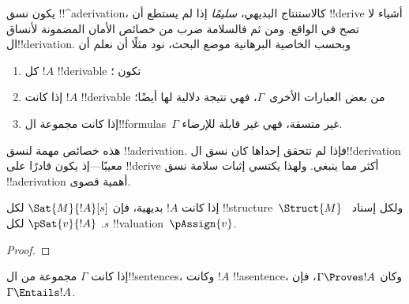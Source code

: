 \documentclass[../../../include/open-logic-section]{subfiles}
\begin{document}
      {}
      {}


\begin{explain}
يكون نسق !!^a{derivation}، كالاستنتاج البديهي، \emph{سليمًا} إذا لم
يستطع أن !!{derive} أشياء لا تصح في الواقع. ومن ثم فالسلامة ضرب من
خصائص الأمان المضمونة لأنساق ال!!{derivation}. وبحسب الخاصية البرهانية
موضع البحث، نود مثلًا أن نعلم أن
\begin{enumerate}
\item كل $!A$ !!{derivable} تكون ؛
\item إذا كانت $!A$ !!{derivable} من بعض العبارات الأخرى~$\Gamma$،
  فهي نتيجة دلالية لها أيضًا؛
\item إذا كانت مجموعة ال!!{formula}s~$\Gamma$ غير متسقة، فهي غير قابلة
  للإرضاء.
\end{enumerate}
هذه خصائص مهمة لنسق !!a{derivation}. فإذا لم تتحقق إحداها كان نسق
ال!!{derivation} معيبًا---إذ يكون قادرًا على !!{derive} أكثر مما ينبغي.
ولهذا يكتسي إثبات سلامة نسق !!a{derivation} أهمية قصوى.
\end{explain}

\begin{prop}
  إذا كانت $!A$ بديهية، فإن
    {$\Sat{M}{!A}[s]$ لكل !!{structure}~$\Struct{M}$ ولكل إسناد~$s$.}
    {$\pSat{v}{!A}$ لكل !!{valuation}~$\pAssign{v}$.}
\end{prop}

\begin{proof}
\end{proof}

\begin{thm}[السلامة]
إذا كانت $\Gamma$ مجموعة من ال!!{sentence}s، وكانت $!A$ !!a{sentence}،
وكان $\Gamma \Proves !A$، فإن $\Gamma \Entails !A$.
\end{thm}
\end{document}
